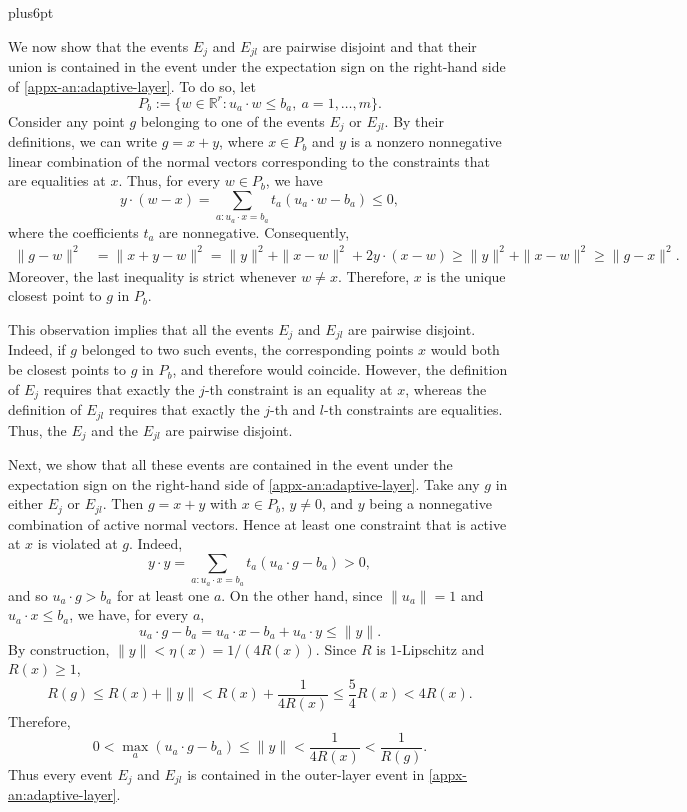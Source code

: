 \documentclass[11pt,letterpaper,twoside,leqno]{article}
\makeatletter
\theoremstyle{bookplain}
\theoremstyle{bookremark}
\renewenvironment{proof}[1][\proofname]{\par
  \pushQED{\qed}\normalfont\topsep6pt plus6pt\relax
  \trivlist\item[\hskip\labelsep\bfseries #1\@addpunct{.}]\ignorespaces
}{\popQED\endtrivlist\@endpefalse}
\newcommand{\R}{\mathbb R}
\makeatother
\begin{document}
\begin{proof}
We now show that the events \(E_j\) and
\(E_{jl}\) are pairwise disjoint and that their union is
contained in the event under the expectation sign on the right-hand side of
\eqref{appx-an:adaptive-layer}.
To do so, let
\[
P_b:=\{w\in\R^r:u_a\cdot w\le b_a,\ a=1,\dots,m\}.
\]
Consider any point \(g\) belonging to one of the events
\(E_j\) or \(E_{jl}\). By their definitions, we can write
\(g=x+y\), where \(x\in P_b\) and \(y\) is a nonzero
nonnegative linear combination of the normal vectors corresponding
to the constraints that are equalities at \(x\).
Thus, for every \(w\in P_b\), we have
\[
y\cdot(w-x)
=\sum_{a:u_a\cdot x=b_a}t_a(u_a\cdot w-b_a)
\le0,
\]
where the coefficients \(t_a\) are nonnegative. Consequently,
\[
\begin{aligned}
\|g-w\|^2
&=\|x+y-w\|^2=\|y\|^2+\|x-w\|^2+2y\cdot(x-w)\ge\|y\|^2+\|x-w\|^2
\ge\|g-x\|^2.
\end{aligned}
\]
Moreover, the last inequality is strict whenever \(w\ne x\).
Therefore, \(x\) is the unique closest point to \(g\) in \(P_b\).

This observation implies that all the events \(E_j\) and
\(E_{jl}\) are pairwise disjoint. Indeed, if \(g\) belonged
to two such events, the corresponding points \(x\) would
both be closest points to \(g\) in \(P_b\), and therefore
would coincide. However, the definition of \(E_j\) requires
that exactly the \(j\)-th constraint is an equality at \(x\),
whereas the definition of \(E_{jl}\) requires that exactly
the \(j\)-th and \(l\)-th constraints are equalities. Thus, the $E_j$ and the $E_{jl}$ are pairwise disjoint.

Next, we show that all these events are contained in the event under the expectation sign on the right-hand side of \eqref{appx-an:adaptive-layer}. Take any $g$ in either $E_j$ or $E_{jl}$.
Then \(g=x+y\) with \(x\in P_b\),
\(y\ne0\), and \(y\) being a nonnegative combination of active
normal vectors. Hence at least one constraint that is active at $x$ is violated
at \(g\). Indeed,
\[
y\cdot y
=\sum_{a:u_a\cdot x=b_a}t_a(u_a\cdot g-b_a)>0,
\]
and so \(u_a\cdot g>b_a\) for at least one \(a\).
On the other hand, since \(\|u_a\|=1\) and
\(u_a\cdot x\le b_a\), we have, for every \(a\),
\[
u_a\cdot g-b_a
=u_a\cdot x-b_a+u_a\cdot y
\le\|y\|.
\]
By construction, \(\|y\|<\eta(x)=1/(4R(x))\).
Since \(R\) is \(1\)-Lipschitz and \(R(x)\ge1\),
\[
R(g)\le R(x)+\|y\|
<R(x)+\frac1{4R(x)}
\le\frac54R(x)<4R(x).
\]
Therefore,
\[
0<\max_a(u_a\cdot g-b_a)
\le\|y\|<\frac1{4R(x)}
<\frac1{R(g)}.
\]
Thus every event \(E_j\) and \(E_{jl}\) is contained in
the outer-layer event in \eqref{appx-an:adaptive-layer}.


\end{proof}
\end{document}
